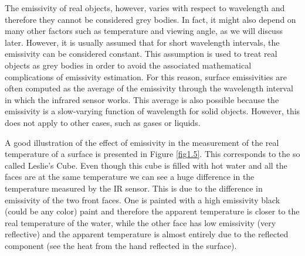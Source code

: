 		\bigskip
		The emissivity of real objects, however, varies with respect to wavelength and therefore they cannot be considered grey bodies. In fact, it might also depend on many other factors such as temperature and viewing angle, as we will discuss later. However, it is usually assumed that for short wavelength intervals, the emissivity can be considered constant. This assumption is used to treat real objects as grey bodies in order to avoid the associated mathematical complications of emissivity estimation. For this reason, surface emissivities are often computed as the average of the emissivity through the wavelength interval in which the infrared sensor works. This average is also possible because the emissivity is a slow-varying function of wavelength for solid objects. However, this does not apply to other cases, such as gases or liquids.
		
		A good illustration of the effect of emissivity in the measurement of the real temperature of a surface is presented in Figure \ref{fig1.5}. This corresponds to the so called Leslie’s Cube. Even though this cube is filled with hot water and all the faces are at the same temperature we can see a huge difference in the temperature measured by the IR sensor. This is due to the difference in emissivity of the two front faces. One is painted with a high emissivity black (could be any color) paint and therefore the apparent temperature is closer to the real temperature of the water, while the other face has low emissivity (very reflective) and the apparent temperature is almost entirely due to the reflected component (see the heat from the hand reflected in the surface).
		
